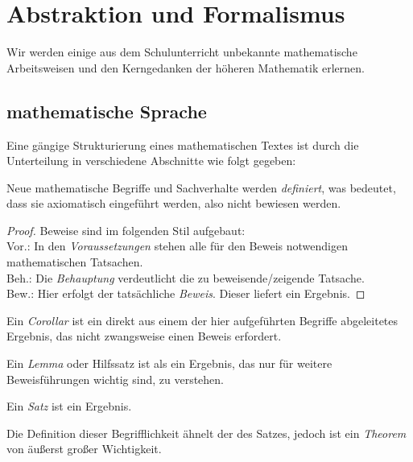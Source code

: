 \chapter{Abstraktion und Formalismus}
\label{sec:AuF}
Wir werden einige aus dem Schulunterricht unbekannte mathematische Arbeitsweisen und den Kerngedanken der höheren Mathematik erlernen.

\section{mathematische Sprache}
Eine gängige Strukturierung eines mathematischen Textes ist durch die Unterteilung in verschiedene Abschnitte wie folgt gegeben:

\theoremstyle{definition}
\begin{definition}{}
Neue mathematische Begriffe und Sachverhalte werden \emph{definiert}, was bedeutet, dass sie axiomatisch eingeführt werden, also nicht bewiesen werden.
\end{definition}

\begin{proof}
Beweise sind im folgenden Stil aufgebaut:
\\ Vor.: In den \emph{Voraussetzungen} stehen alle für den Beweis notwendigen mathematischen Tatsachen.
\\ Beh.: Die \emph{Behauptung} verdeutlicht die zu beweisende/zeigende Tatsache.
\\ Bew.: Hier erfolgt der tatsächliche \emph{Beweis}. Dieser liefert ein Ergebnis.
\end{proof}

\theoremstyle{Corollar}
\begin{Corollar}
Ein \emph{Corollar} ist ein direkt aus einem der hier aufgeführten Begriffe abgeleitetes Ergebnis, das nicht zwangsweise einen Beweis erfordert.
\end{Corollar}

\theoremstyle{Lemma}
\begin{Lemma}{}
Ein \emph{Lemma} oder Hilfssatz ist als ein Ergebnis, das nur für weitere Beweisführungen wichtig sind, zu verstehen.
\end{Lemma}

\theoremstyle{Satz}
\begin{Satz}{}
Ein \emph{Satz} ist ein Ergebnis. 
\end{Satz}

\theoremstyle{theo}
\begin{theo}
Die Definition dieser Begrifflichkeit ähnelt der des Satzes, jedoch ist ein \emph{Theorem} von äußerst großer Wichtigkeit.
\end{theo}

